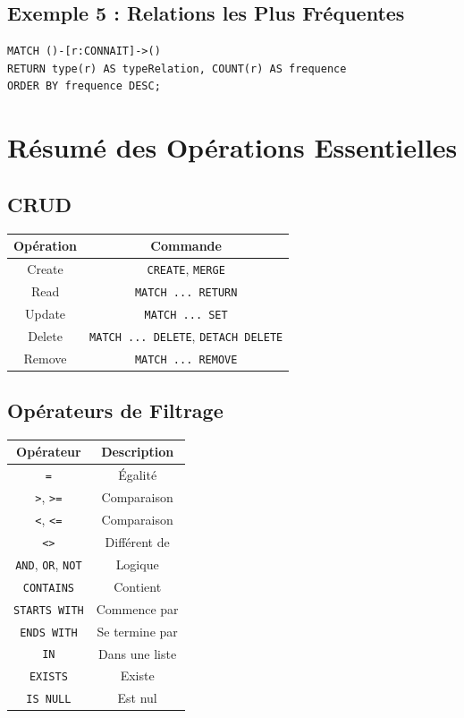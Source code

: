 \documentclass[11pt,a4paper]{article}
\begin{document}
\subsection{Exemple 5 : Relations les Plus Fréquentes}

\begin{lstlisting}
MATCH ()-[r:CONNAIT]->()
RETURN type(r) AS typeRelation, COUNT(r) AS frequence
ORDER BY frequence DESC;
\end{lstlisting}

\newpage

\section{Résumé des Opérations Essentielles}

\subsection{CRUD}

\begin{table}[h]
\centering
\begin{tabular}{|c|c|}
\hline
\textbf{Opération} & \textbf{Commande} \\
\hline
Create & \texttt{CREATE}, \texttt{MERGE} \\
\hline
Read & \texttt{MATCH ... RETURN} \\
\hline
Update & \texttt{MATCH ... SET} \\
\hline
Delete & \texttt{MATCH ... DELETE}, \texttt{DETACH DELETE} \\
\hline
Remove & \texttt{MATCH ... REMOVE} \\
\hline
\end{tabular}
\end{table}

\subsection{Opérateurs de Filtrage}

\begin{table}[h]
\centering
\begin{tabular}{|c|c|}
\hline
\textbf{Opérateur} & \textbf{Description} \\
\hline
\texttt{=} & Égalité \\
\hline
\texttt{>}, \texttt{>=} & Comparaison \\
\hline
\texttt{<}, \texttt{<=} & Comparaison \\
\hline
\texttt{<>} & Différent de \\
\hline
\texttt{AND}, \texttt{OR}, \texttt{NOT} & Logique \\
\hline
\texttt{CONTAINS} & Contient \\
\hline
\texttt{STARTS WITH} & Commence par \\
\hline
\texttt{ENDS WITH} & Se termine par \\
\hline
\texttt{IN} & Dans une liste \\
\hline
\texttt{EXISTS} & Existe \\
\hline
\texttt{IS NULL} & Est nul \\
\hline
\end{tabular}
\end{table}
\end{document}
